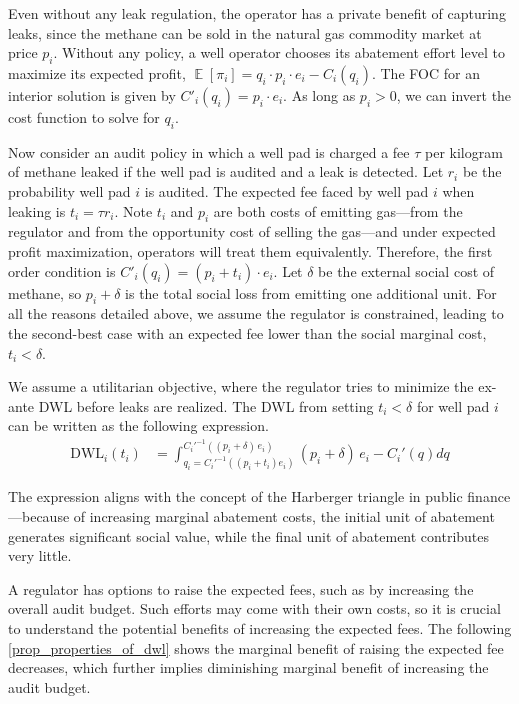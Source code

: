 \documentclass[12pt,oneside,letterpaper]{article}
\theoremstyle{definition}
\DeclareMathOperator{\blackboardE}{\mathbb{E}}
\newcommand{\expected}[1]{\blackboardE\left[#1\right]}
\begin{document}
\begin{refsection}
Even without any leak regulation, the operator has a private benefit of capturing leaks, since the methane can be sold in the natural gas commodity market at price \(p_i\).
Without any policy, a well operator chooses its abatement effort level to maximize its expected profit,
\(\expected{\pi_i} = q_i \cdot p_i \cdot e_i - C_i(q_i)\).
The \gls{FOC} for an interior solution is given by \(C'_i(q_i) = p_i \cdot e_i\).
As long as \(p_i > 0\), we can invert the cost function to solve for \(q_i\).

Now consider an audit policy in which a well pad is charged a fee \(\tau\) per kilogram of methane leaked if the well pad is audited and a leak is detected.
Let \(r_i\) be the probability well pad \(i\) is audited.
The expected fee faced by well pad \(i\) when leaking is \(t_i = \tau r_i \).
Note \(t_i\) and \(p_i\) are both costs of emitting gas---from the regulator and from the opportunity cost of selling the gas---and under expected profit maximization, operators will treat them equivalently.
Therefore, the first order condition is \(C'_i(q_i) = (p_i + t_i) \cdot e_i\).
Let \(\delta\) be the external social cost of methane, so \(p_i + \delta\) is the total social loss from emitting one additional unit.
For all the reasons detailed above, we assume the regulator is constrained, leading to the second-best case with an expected fee lower than the social marginal cost, \(t_i < \delta\).

We assume a utilitarian objective, where the regulator tries to minimize the ex-ante \gls{DWL} before leaks are realized.
The \gls{DWL} from setting \(t_i < \delta\) for well pad \(i\) can be written as the following expression.
\begin{align*}
\text{DWL}_i(t_i) &=
\int_{q_i={C_i'}^{-1}((p_i + t_i) e_i)}^{{C_i'}^{-1}((p_i + \delta) \, e_i)}
 (p_i + \delta)\, e_i - C_i'(q)  d q
\end{align*}

The expression aligns with the concept of the Harberger triangle in public finance---because of increasing marginal abatement costs, the initial unit of abatement generates significant social value, while the final unit of abatement contributes very little.

A regulator has options to raise the expected fees, such as by increasing the overall audit budget.
Such efforts may come with their own costs, so it is crucial to understand the potential benefits of increasing the expected fees.
The following \autoref{prop_properties_of_dwl} shows the marginal benefit of raising the expected fee decreases, which further implies diminishing marginal benefit of increasing the audit budget.


\end{refsection}
\end{document}
